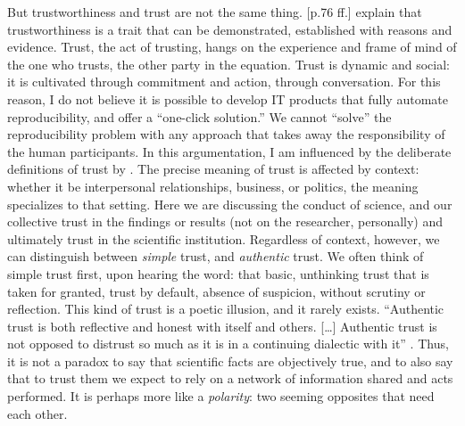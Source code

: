 \documentclass{statement}
\newlength{\up}
\begin{document}
But trustworthiness and trust are not the same thing. 
\cite{solomon-flores2003} [p.76 ff.] explain that trustworthiness is a trait that can be demonstrated, established with reasons and evidence. 
Trust, the act of trusting, hangs on the experience and frame of mind of the one who trusts, the other party in the equation. 
Trust is dynamic and social: it is cultivated through commitment and action, through conversation. 
For this reason, I do not believe it is possible to develop IT products that fully automate reproducibility, and offer a ``one-click solution.'' 
We cannot ``solve'' the reproducibility problem with any approach that takes away the responsibility of the human participants. 
In this argumentation, I am influenced by the  deliberate definitions of trust by \cite{solomon-flores2003}. 
The precise meaning of trust is affected by context: whether it be interpersonal relationships, business, or politics, the meaning specializes to that setting. 
Here we are discussing the conduct of science, and our collective trust in the findings or results (not on the researcher, personally) and ultimately trust in the scientific institution. 
Regardless of context, however, we can distinguish between \emph{simple} trust, and \emph{authentic} trust. 
We often think of simple trust first, upon hearing the word: that basic, unthinking trust that is taken for granted, trust by default, absence of suspicion, without scrutiny or reflection. 
This kind of trust is a poetic illusion, and it rarely exists. 
``Authentic trust is both reflective and honest with itself and others. […] Authentic trust is not opposed to distrust so much as it is in a continuing dialectic with it'' \citep[p.92]{solomon-flores2003}. 
Thus, it is not a paradox to say that scientific facts are objectively true, and to also say that to trust them we expect to rely on a network of information shared and acts performed. 
It is perhaps more like a \emph{polarity}: two seeming opposites that need each other.
\end{document}
